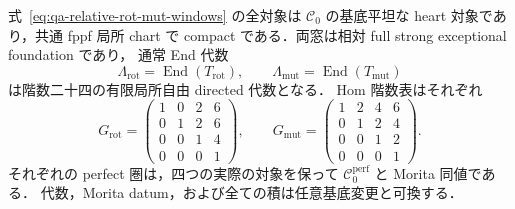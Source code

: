 \begin{proposition}[二つの実際の相対tilting窓]
\label{prop:qa-relative-rot-mut-finite-tilting}
式~\eqref{eq:qa-relative-rot-mut-windows} の全対象は
$\mathcal C_0$ の基底平坦な heart 対象であり，共通 fppf 局所 chart で
compact である．両窓は相対 full strong exceptional foundation であり，
通常 End 代数
\[
 \Lambda_{\mathrm{rot}}=\operatorname{End}(T_{\mathrm{rot}}),\qquad
 \Lambda_{\mathrm{mut}}=\operatorname{End}(T_{\mathrm{mut}})
\]
は階数二十四の有限局所自由 directed 代数となる．
Hom 階数表はそれぞれ
\[
 G_{\mathrm{rot}}=
 \begin{pmatrix}
 1&0&2&6\\0&1&2&6\\0&0&1&4\\0&0&0&1
 \end{pmatrix},\qquad
 G_{\mathrm{mut}}=
 \begin{pmatrix}
 1&2&4&6\\0&1&2&4\\0&0&1&2\\0&0&0&1
 \end{pmatrix}.
 \tag{RH}\label{eq:qa-relative-rot-mut-rank-tables}
\]
それぞれの perfect 圏は，四つの実際の対象を保って
$\mathcal C_0^{\mathrm{perf}}$ と Morita 同値である．
代数，Morita datum，および全ての積は任意基底変更と可換する．
\end{proposition}
